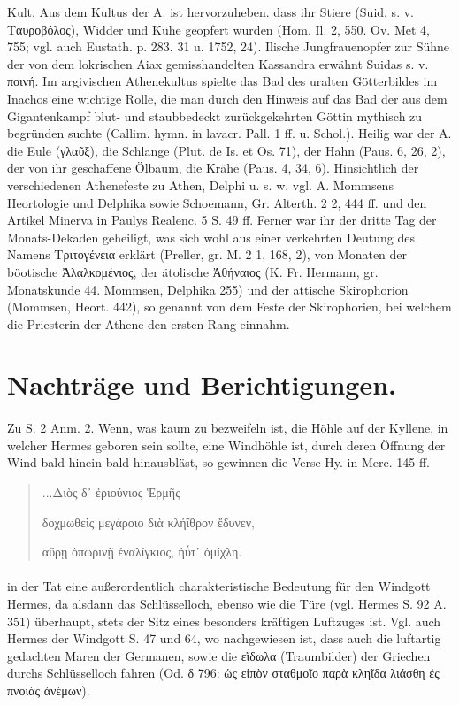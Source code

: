\documentclass[a4paper, 11pt, oneside]{article}
\begin{document}
Kult. Aus dem Kultus der A. ist hervorzuheben. dass ihr Stiere (Suid. s. v. Ταυροβόλος), Widder und Kühe geopfert wurden (Hom. Il. 2, 550. Ov. Met 4, 755; vgl. auch Eustath. p. 283. 31 u. 1752, 24). Ilische Jungfrauenopfer zur Sühne der von dem lokrischen Aiax gemisshandelten Kassandra erwähnt Suidas s. v. ποινή. Im argivischen Athenekultus spielte das Bad des uralten Götterbildes im Inachos eine wichtige Rolle, die man durch den Hinweis auf das Bad der aus dem Gigantenkampf blut- und staubbedeckt zurückgekehrten Göttin mythisch zu begründen suchte (Callim. hymn. in lavacr. Pall. 1 ff. u. Schol.). Heilig war der A. die Eule (γλαῦξ), die Schlange (Plut. de Is. et Os. 71), der Hahn (Paus. 6, 26, 2), der von ihr geschaffene Ölbaum, die Krähe (Paus. 4, 34, 6). Hinsichtlich der verschiedenen Athenefeste zu Athen, Delphi u. s. w. vgl. A. Mommsens Heortologie und Delphika sowie Schoemann, Gr. Alterth. 2 2, 444 ff. und den Artikel Minerva in Paulys Realenc. 5 S. 49 ff. Ferner war ihr der dritte Tag der Monats-Dekaden geheiligt, was sich wohl aus einer verkehrten Deutung des Namens Τριτογένεια erklärt (Preller, gr. M. 2 1, 168, 2), von Monaten der böotische Ἀλαλκομένιος, der ätolische Ἀθήναιος (K. Fr. Hermann, gr. Monatskunde 44. Mommsen, Delphika 255) und der attische Skirophorion (Mommsen, Heort. 442), so genannt von dem Feste der Skirophorien, bei welchem die Priesterin der Athene den ersten Rang einnahm.
\clearpage
\section*{Nachträge und Berichtigungen.}
\paragraph{}
Zu S. 2 Anm. 2. Wenn, was kaum zu bezweifeln ist, die Höhle auf der Kyllene, in welcher Hermes geboren sein sollte, eine Windhöhle ist, durch deren Öffnung der Wind bald hinein-bald hinausbläst, so gewinnen die Verse Hy. in Merc. 145 ff.
\begin{quotation}\large
\hspace*{5mm}...Διὸς δ᾽ ἐριούνιος Ἑρμῆς

δοχμωθεὶς μεγάροιο διὰ κλήΐθρον ἔδυνεν,

αὔρῃ ὀπωρινῇ ἐναλίγκιος, ἠΰτ᾽ ὀμίχλη.
\end{quotation}
\paragraph{}
in der Tat eine außerordentlich charakteristische Bedeutung für den Windgott Hermes, da alsdann das Schlüsselloch, ebenso wie die Türe (vgl. Hermes S. 92 A. 351) überhaupt, stets der Sitz eines besonders kräftigen Luftzuges ist. Vgl. auch Hermes der Windgott S. 47 und 64, wo nachgewiesen ist, dass auch die luftartig gedachten Maren der Germanen, sowie die εἴδωλα (Traumbilder) der Griechen durchs Schlüsselloch fahren (Od. δ 796: ὡς εἰπὸν σταθμοῖο παρὰ κληῖδα λιάσθη ἐς πνοιὰς ἀνέμων).
\end{document}

